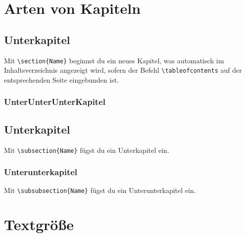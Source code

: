 \documentclass[12pt, a4paper]{article} %
\begin{document}
\section{Arten von Kapiteln}
\subsection{Unterkapitel}
Mit \verb|\section{Name}| beginnst du ein neues Kapitel, was automatisch im Inhaltsverzeichnis angezeigt wird, sofern der Befehl \verb|\tableofcontents| auf der entsprechenden Seite eingebunden ist.
\subsubsection{UnterUnterUnterKapitel}
\subsection{Unterkapitel}

Mit \verb|\subsection{Name}| f\"ugst du ein Unterkapitel ein.

\subsubsection{Unterunterkapitel}

Mit \verb|\subsubsection{Name}| f\"ugst du ein Unterunterkapitel ein.

\section{Textgr\"o\ss e}



\end{document}
